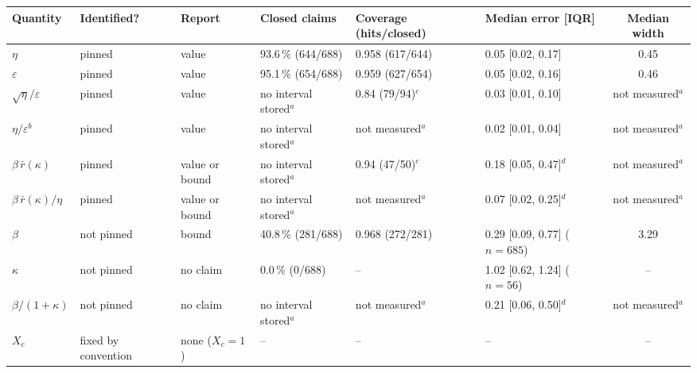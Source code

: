 \begin{tabular}{llllllc}
\toprule
Quantity & Identified? & Report & Closed claims & Coverage (hits/closed) & Median error [IQR] & Median width \\
\midrule
$\eta$ & pinned & value & 93.6\,\% (644/688) & 0.958 (617/644) & 0.05 [0.02, 0.17] & 0.45 \\
$\varepsilon$ & pinned & value & 95.1\,\% (654/688) & 0.959 (627/654) & 0.05 [0.02, 0.16] & 0.46 \\
$\sqrt{\eta}/\varepsilon$ & pinned & value & no interval stored$^{a}$ & 0.84 (79/94)$^{c}$ & 0.03 [0.01, 0.10] & not measured$^{a}$ \\
$\eta/\varepsilon^{b}$ & pinned & value & no interval stored$^{a}$ & not measured$^{a}$ & 0.02 [0.01, 0.04] & not measured$^{a}$ \\
\addlinespace
$\beta\,\bar r(\kappa)$ & pinned & value or bound & no interval stored$^{a}$ & 0.94 (47/50)$^{c}$ & 0.18 [0.05, 0.47]$^{d}$ & not measured$^{a}$ \\
$\beta\,\bar r(\kappa)/\eta$ & pinned & value or bound & no interval stored$^{a}$ & not measured$^{a}$ & 0.07 [0.02, 0.25]$^{d}$ & not measured$^{a}$ \\
\addlinespace
$\beta$ & not pinned & bound & 40.8\,\% (281/688) & 0.968 (272/281) & 0.29 [0.09, 0.77] ($n=685$) & 3.29 \\
$\kappa$ & not pinned & no claim & 0.0\,\% (0/688) & -- & 1.02 [0.62, 1.24] ($n=56$) & -- \\
$\beta/(1+\kappa)$ & not pinned & no claim & no interval stored$^{a}$ & not measured$^{a}$ & 0.21 [0.06, 0.50]$^{d}$ & not measured$^{a}$ \\
$X_c$ & fixed by convention & none ($X_c=1$) & -- & -- & -- & -- \\
\bottomrule
\end{tabular}
